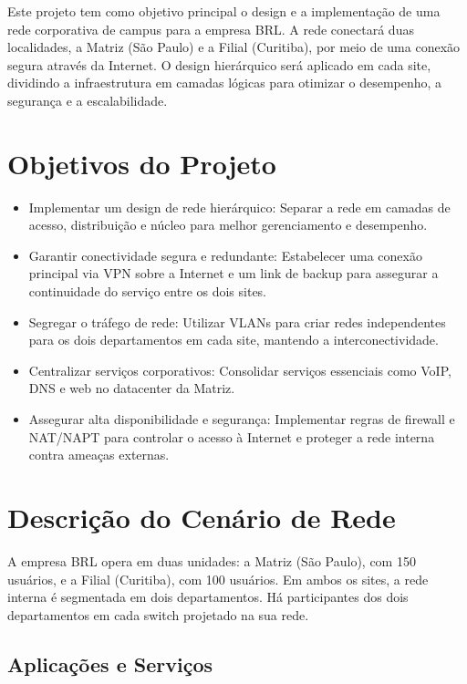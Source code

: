 \documentclass[a4paper, 12pt]{article}
\begin{document}
Este projeto tem como objetivo principal o design e a implementação de uma rede corporativa de campus para a empresa BRL. A rede conectará duas localidades, a Matriz (São Paulo) e a Filial (Curitiba), por meio de uma conexão segura através da Internet. O design hierárquico será aplicado em cada site, dividindo a infraestrutura em camadas lógicas para otimizar o desempenho, a segurança e a escalabilidade.

\section{Objetivos do Projeto}
\label{sec:objetivos}

\begin{itemize}
    \item Implementar um design de rede hierárquico: Separar a rede em camadas de acesso, distribuição e núcleo para melhor gerenciamento e desempenho.
    \item Garantir conectividade segura e redundante: Estabelecer uma conexão principal via VPN sobre a Internet e um link de backup para assegurar a continuidade do serviço entre os dois sites.
    \item Segregar o tráfego de rede: Utilizar VLANs para criar redes independentes para os dois departamentos em cada site, mantendo a interconectividade.
    \item Centralizar serviços corporativos: Consolidar serviços essenciais como VoIP, DNS e web no datacenter da Matriz.
    \item Assegurar alta disponibilidade e segurança: Implementar regras de firewall e NAT/NAPT para controlar o acesso à Internet e proteger a rede interna contra ameaças externas.
\end{itemize}

\section{Descrição do Cenário de Rede}
\label{sec:descricao}

A empresa BRL opera em duas unidades: a Matriz (São Paulo), com 150 usuários, e a Filial (Curitiba), com 100 usuários. Em ambos os sites, a rede interna é segmentada em dois departamentos. Há participantes dos dois departamentos em cada switch projetado na sua rede.

\subsection{Aplicações e Serviços}
\label{subsec:aplicacoes}
\end{document}
